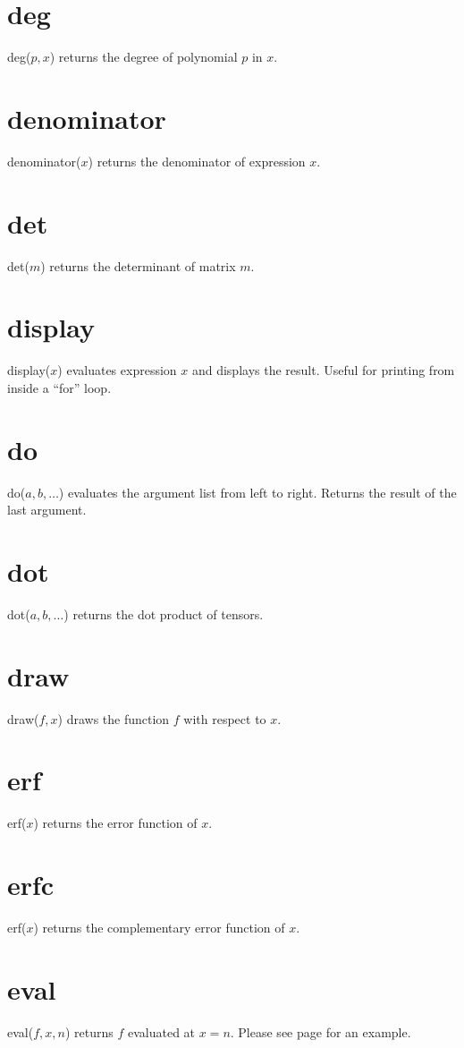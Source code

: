 \documentclass[12pt]{book}
\begin{document}
\section*{deg}
deg($p,x$) returns the degree of polynomial $p$ in $x$.

\section*{denominator}
denominator($x$) returns the denominator of expression $x$.

\section*{det}
det($m$) returns the determinant of matrix $m$.

\section*{display}
display($x$) evaluates expression $x$ and displays the result.
Useful for printing from inside a ``for'' loop.

\section*{do}
do($a,b,\ldots$) evaluates the argument list from left to right.
Returns the result of the last argument.

\section*{dot}
dot($a,b,\ldots$) returns the dot product of tensors.

\section*{draw}
draw($f,x$) draws the function $f$ with respect to $x$.

\section*{erf}
erf($x$) returns the error function of $x$.

\section*{erfc}
erf($x$) returns the complementary error function of $x$.

\section*{eval}
eval($f,x,n$) returns $f$ evaluated at $x=n$.
Please see page \pageref{integral} for an example.
\end{document}
